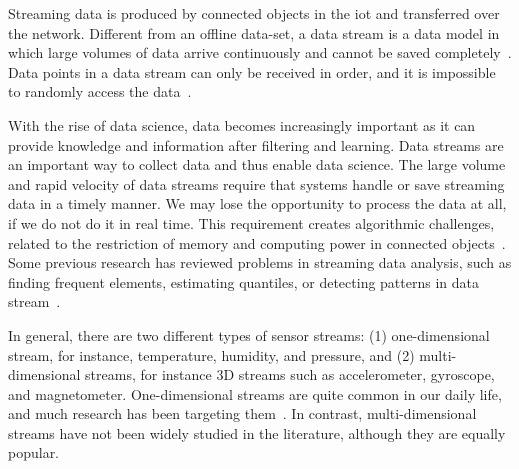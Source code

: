 Streaming data is produced by connected objects in the \acrshort{iot} and
transferred over the network. Different from an offline data-set, a data stream
is a data model in which large volumes of data arrive continuously and cannot be
saved completely~\cite{o2002streaming}. Data points in a data stream can
only be received in order, and it is impossible to randomly access the
data~\cite{o2002streaming}.

With the rise of data science, data becomes increasingly important as it can
provide knowledge and information after filtering and learning. Data streams are
an important way to collect data and thus enable data science. The large volume
and rapid velocity of data streams require that systems handle or save streaming
data in a timely manner. We may lose the opportunity to process the data at all,
if we do not do it in real time. This requirement creates algorithmic
challenges, related to the restriction of memory and computing power in
connected objects~\cite{o2002streaming}. Some previous research has reviewed
problems in streaming data analysis, such as finding frequent elements,
estimating quantiles, or detecting patterns in data
stream~\cite{kejariwal2015real}.

In general, there are two different types of sensor streams: (1) one-dimensional
stream, for instance, temperature, humidity, and pressure, and (2)
multi-dimensional streams, for instance 3D streams such as accelerometer,
gyroscope, and magnetometer. One-dimensional streams are quite common in our
daily life, and much research has been targeting
them~\cite{kulwicki1991humidity, oprea2009temperature, woyessa2016temperature}.
In contrast, multi-dimensional streams have not been widely studied in the
literature, although they are equally popular.



